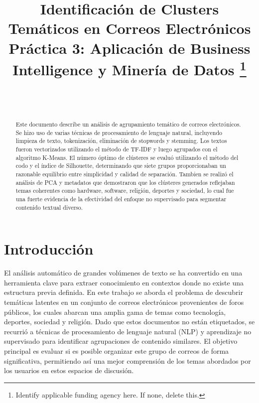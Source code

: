 \documentclass[journal]{IEEEtran} %
\begin{document}
\title{Identificación de Clusters Temáticos en Correos Electrónicos\\
{\footnotesize Práctica 3: Aplicación de Business Intelligence y Minería de Datos}
\thanks{Identify applicable funding agency here. If none, delete this.}
}

\author{%
    \\%
    \\%
}
\maketitle

\begin{abstract}
    Este documento describe un análisis de agrupamiento temático de correos electrónicos. Se hizo uso de varias técnicas de procesamiento de lenguaje natural, incluyendo limpieza de texto, tokenización, eliminación de stopwords y stemming. Los textos fueron vectorizados utilizando el método de TF-IDF y luego agrupados con el algoritmo K-Means. El número óptimo de clústeres se evaluó utilizando el método del codo y el índice de Silhouette, determinando que siete grupos proporcionaban un razonable equilibrio entre simplicidad y calidad de separación. Tambien se realizó el análisis de PCA y metadatos que demostraron que los clústeres generados reflejaban temas coherentes como hardware, software, religión, deportes y sociedad, lo cual fue una fuerte evidencia de la efectividad del enfoque no supervisado para segmentar contenido textual diverso.
\end{abstract}


\section{Introducción}
El análisis automático de grandes volúmenes de texto se ha convertido en una herramienta clave para extraer conocimiento en contextos donde no existe una estructura previa definida. En este trabajo se aborda el problema de descubrir temáticas latentes en un conjunto de correos electrónicos provenientes de foros públicos, los cuales abarcan una amplia gama de temas como tecnología, deportes, sociedad y religión. Dado que estos documentos no están etiquetados, se recurrió a técnicas de procesamiento de lenguaje natural (NLP) y aprendizaje no supervisado para identificar agrupaciones de contenido similares. El objetivo principal es evaluar si es posible organizar este grupo de correos de forma significativa, permitiendo así una mejor comprensión de los temas abordados por los usuarios en estos espacios de discusión.
\end{document}
